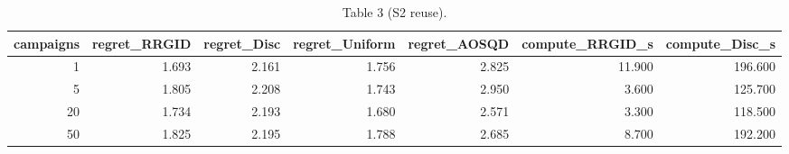 \begin{table}[t]
\centering
\small
\caption{Table 3 (S2 reuse).}
\label{tab:Table_3_S2_reuse}
\begin{tabular}{rrrrrrr}
\toprule
campaigns & regret\_RRGID & regret\_Disc & regret\_Uniform & regret\_AOSQD & compute\_RRGID\_s & compute\_Disc\_s \\
\midrule
1 & 1.693 & 2.161 & 1.756 & 2.825 & 11.900 & 196.600 \\
5 & 1.805 & 2.208 & 1.743 & 2.950 & 3.600 & 125.700 \\
20 & 1.734 & 2.193 & 1.680 & 2.571 & 3.300 & 118.500 \\
50 & 1.825 & 2.195 & 1.788 & 2.685 & 8.700 & 192.200 \\
\bottomrule
\end{tabular}
\end{table}
